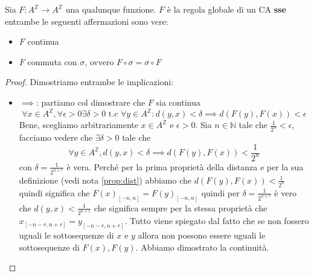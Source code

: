 \begin{teorema}  \label{th:hedlund}
    Sia $F:A^\mathbb{Z}\rightarrow A^\mathbb{Z}$ una qualunque funzione.
    $F$ è la regola globale di un CA \textbf{sse} entrambe le seguenti affermazioni
    sono vere:
    \begin{itemize}
        \item $F$ continua
        \item $F$ commuta con $\sigma$, ovvero $ F\circ\sigma =\sigma \circ F$
    \end{itemize}
    \begin{proof}
        Dimostriamo entrambe le implicazioni:
        \begin{itemize}
            \item $\implies$: partiamo col dimostrare che $F$ sia continua
                  $$\forall x \in A^\mathbb{Z}, \forall \epsilon > 0 \exists \delta> 0 \text{ t.c } \forall y \in A^\mathbb{Z}: d(y, x) < \delta \implies d(F(y), F(x))< \epsilon$$
                  Bene, scegliamo arbitrariamente $x\in  A^\mathbb{Z}$ e $\epsilon >0$.
                  Sia $n\in \mathbb{N}$ tale che $\frac{1}{2^n} < \epsilon $, facciamo vedere
                  che $\exists \delta>0$ tale che
                  $$\forall y\in A^\mathbb{Z}, d(y,x) < \delta \implies d(F(y), F(x))< \frac{1}{2^n}$$
                  con $\delta=\frac{1}{2^{n+r}}$ è vera. Perché per la prima proprietà
                  della distanza e per la sua definizione (vedi nota \ref{prop:dist}) abbiamo che $d(F(y),F(x)) < \frac{1}{2^{n}}$
                  quindi significa che $F(x)_{[-n,n]} = F(y)_{[-n,n]}$ quindi per
                  $\delta=\frac{1}{2^{n+r}}$ è vero che $d(y,x) < \frac{1}{2^{n+r}}$
                  che significa sempre per la stessa proprietà che $x_{[-n-r,n+r]} = y_{[-n-r,n+r]}$.
                  Tutto viene spiegato dal fatto che se non fossero uguali le sottosequenze
                  di $x$ e $y$ allora non possono essere uguali le sottosequenze di $F(x), F(y)$.
                  Abbiamo dimostrato la continuità.


\end{itemize}
\end{proof}
\end{teorema}
